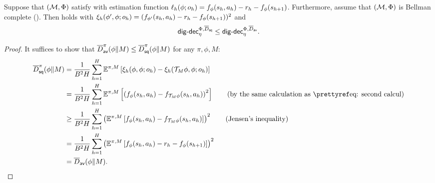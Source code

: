 \begin{lemma}\label{lem: connecting two digdec}
    Suppose that $(\mathcal{M},\Phi)$ satisfy  with estimation function $\ell_h(\phi; o_h) = f_\phi(s_h,a_h) - r_h - f_\phi(s_{h+1})$. Furthermore, assume that $(\mathcal{M}, \Phi)$ is Bellman complete (). Then  holds with $\xi_h(\phi', \phi; o_h) = (f_{\phi'}(s_h,a_h) - r_h - f_{\phi}(s_{h+1}))^2$ and 
    \begin{align*} 
        \mathsf{dig}\text{-}\mathsf{dec}_\eta^{\Phi, \overline{D}_{\mathsf{sq}}} \leq \mathsf{dig}\text{-}\mathsf{dec}_\eta^{\Phi, \overline{D}_{\mathsf{av}}}. 
    \end{align*}
\end{lemma}
\begin{proof}
   It suffices to show that $\overline{D}_{\mathsf{av}}^\pi(\phi\|M)\leq \overline{D}^\pi_{\mathsf{sq}}(\phi\|M)$ for any $\pi, \phi, M$:  
   \begin{align*}
       \tilD_\sbe^\pi(\phi\|M) &= \frac{1}{B^2H}\sum_{h=1}^H  \E^{\pi, M}\left[\err_h(\phi, \phi; o_h) - \err_h(\calT_M\phi, \phi; o_h)\right] \\
       &= \frac{1}{B^2H}\sum_{h=1}^H  \E^{\pi, M}\left[\left(f_{\phi}(s_{h}, a_{h}) - f_{\calT_M\phi}(s_{h}, a_{h})\right)^2\right] \tag{by the same calculation as \pref{eq: second calcul}}\\
       &\geq \frac{1}{B^2H}\sum_{h=1}^H  \left(\E^{\pi, M}\left[f_{\phi}(s_{h}, a_{h}) - f_{\calT_M\phi}(s_{h}, a_{h})\right]\right)^2  \tag{Jensen's inequality} \\
       &= \frac{1}{B^2H}\sum_{h=1}^H  \left(\E^{\pi, M}\left[f_{\phi}(s_{h}, a_{h}) - r_h - f_\phi(s_{h+1})\right]\right)^2 \\
       &= \tilD_{\bi}(\phi\|M). 
   \end{align*}
\end{proof}


